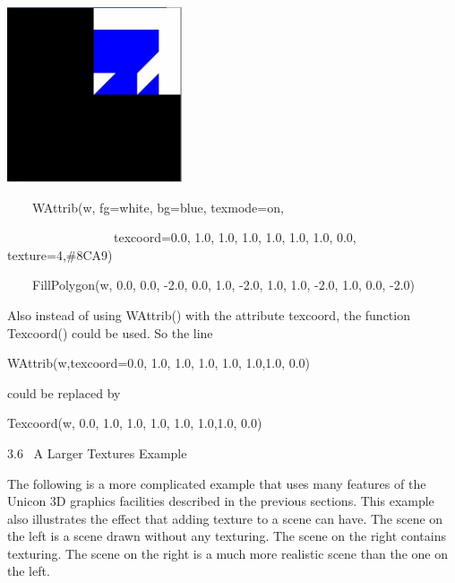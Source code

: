\documentclass[letterpaper]{article}
\begin{document}
\bigskip

{\centering  \includegraphics[width=2.0307in,height=2.0311in]{utr9/utr9-img031.jpg} \par}

\bigskip


\bigskip

{\sffamily
\ \ \ \ WAttrib(w, {\textquotedbl}fg=white{\textquotedbl}, {\textquotedbl}bg=blue{\textquotedbl},
{\textquotedbl}texmode=on{\textquotedbl},}

{\sffamily
\ \ \ \ \ \ \ \ \ \ \ \ \ \ \ \ \ {\textquotedbl}texcoord=0.0, 1.0, 1.0, 1.0, 1.0, 1.0, 1.0, 0.0{\textquotedbl},
{\textquotedbl}texture=4,\#8CA9{\textquotedbl})}

{\sffamily
\ \ \ \ FillPolygon(w, 0.0, 0.0, -2.0, 0.0, 1.0, -2.0, 1.0, 1.0, -2.0, 1.0, 0.0, -2.0) }


\bigskip

{
Also instead of using \textsf{WAttrib()} with the attribute \textsf{texcoord}, the function \textsf{Texcoord()} could be
used. So the line }


\bigskip

{\sffamily
WAttrib(w,{\textquotedbl}texcoord=0.0, 1.0, 1.0, 1.0, 1.0, 1.0,1.0, 0.0{\textquotedbl})}


\bigskip

{
could be replaced by }


\bigskip

{\sffamily
Texcoord(w, 0.0, 1.0, 1.0, 1.0, 1.0, 1.0,1.0, 0.0)\newline
}

{
3.6 \ A Larger Textures Example}


\bigskip

{
The following is a more complicated example that uses many features of the Unicon 3D graphics facilities described in
the previous sections. This example also illustrates the effect that adding texture to a scene can have. The scene on
the left is a scene drawn without any texturing. The scene on the right contains texturing. The scene on the right is a
much more realistic scene than the one on the left. }
\end{document}
